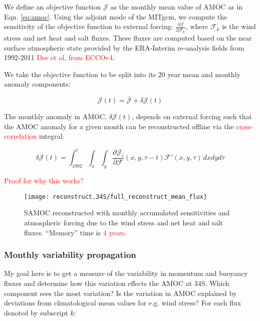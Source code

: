\documentclass[a4paper,11pt]{article}
\newcommand{\pderiv}[3][]{%
  \ensuremath{\frac{\partial^{#1} {#2}}{\partial {#3}^{#1}}}}
\newcommand{\red}[1]{\textcolor{red}{#1}}
\begin{document}
  We define an objective function $\mathcal{J}$ as the monthly mean value of AMOC as in Eqn. \ref{eq:amoc}. Using the adjoint mode of the MITgcm, we compute the sensitivity of the objective function to external forcing: $\pderiv{\mathcal{J}}{\mathcal{F}_k}$, where $\mathcal{F}_k$ is the wind stress and net heat and salt fluxes. These fluxes are computed based on the near surface atmospheric state provided by the ERA-Interim re-analysis fields from 1992-2011 \red{Dee et al, from ECCOv4}. 
	
  We take the objective function to be split into its 20 year mean and monthly anomaly components: 

	\begin{equation}
	  \mathcal{J}(t) = \bar{\mathcal{J}} + \delta\mathcal{J}(t) 
	\end{equation}

  The monthly anomaly in AMOC, $\delta\mathcal{J}(t)$, depends on external forcing such that the AMOC anomaly for a given month can be reconstructed offline via the \red{cross-correlation} integral:
 
	\begin{equation}
	  \delta\mathcal{J}(t) = \int_{1992}^{t}\int_x \int_y\pderiv{\mathcal{J}_i}{\mathcal{F}}(x,y,\tau-t)\mathcal{F}'(x,y,\tau)\, dxdyd\tau  
	  \label{eq:reconstruct}
	\end{equation}

  \red{Proof for why this works?}  

   \begin{figure}
    \centering
    \texttt{[image: reconstruct.34S/full\_reconstruct\_mean\_flux]}
    \caption{SAMOC reconstructed with monthly accumulated sensitivities and atmospheric forcing due to the wind stress and net heat and salt fluxes. ``Memory'' time is \red{4 years}.}
    \label{fig:fullReconstruction}
   \end{figure}

  \subsubsection{Monthly variability propagation}

  My goal here is to get a measure of the variability in momentum and buoyancy fluxes and determine how this variation effects the AMOC at 34S. Which component sees the most variation? Is the variation in AMOC explained by deviations from climatological mean values for e.g. wind stress? For each flux denoted by subscript $k$:
\end{document}
